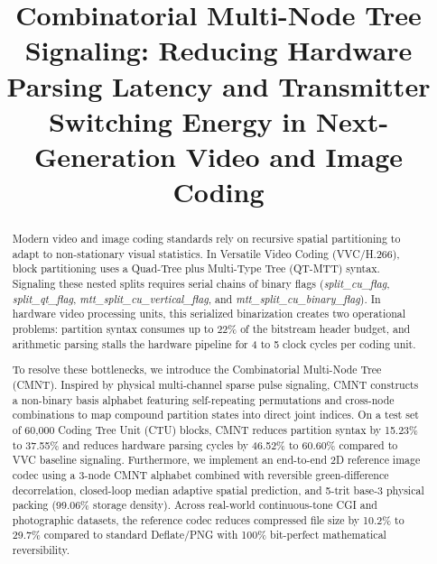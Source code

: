 \documentclass[conference]{IEEEtran}
\begin{document}
\title{Combinatorial Multi-Node Tree Signaling: Reducing Hardware Parsing Latency and Transmitter Switching Energy in Next-Generation Video and Image Coding}

\author{
\and
{}
}

\maketitle

\begin{abstract}
Modern video and image coding standards rely on recursive spatial partitioning to adapt to non-stationary visual statistics. In Versatile Video Coding (VVC/H.266), block partitioning uses a Quad-Tree plus Multi-Type Tree (QT-MTT) syntax. Signaling these nested splits requires serial chains of binary flags (\textit{split\_cu\_flag}, \textit{split\_qt\_flag}, \textit{mtt\_split\_cu\_vertical\_flag}, and \textit{mtt\_split\_cu\_binary\_flag}). In hardware video processing units, this serialized binarization creates two operational problems: partition syntax consumes up to 22\% of the bitstream header budget, and arithmetic parsing stalls the hardware pipeline for 4 to 5 clock cycles per coding unit. 

To resolve these bottlenecks, we introduce the Combinatorial Multi-Node Tree (CMNT). Inspired by physical multi-channel sparse pulse signaling, CMNT constructs a non-binary basis alphabet featuring self-repeating permutations and cross-node combinations to map compound partition states into direct joint indices. On a test set of 60,000 Coding Tree Unit (CTU) blocks, CMNT reduces partition syntax by 15.23\% to 37.55\% and reduces hardware parsing cycles by 46.52\% to 60.60\% compared to VVC baseline signaling. Furthermore, we implement an end-to-end 2D reference image codec using a 3-node CMNT alphabet combined with reversible green-difference decorrelation, closed-loop median adaptive spatial prediction, and 5-trit base-3 physical packing (99.06\% storage density). Across real-world continuous-tone CGI and photographic datasets, the reference codec reduces compressed file size by 10.2\% to 29.7\% compared to standard Deflate/PNG with 100\% bit-perfect mathematical reversibility.
\end{abstract}
\end{document}
